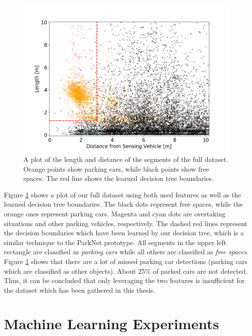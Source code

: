 \begin{figure}
	\centering
	\includegraphics[width=\textwidth]{img/2d_length_distance_scatter_full_dataset_decision_tree_boundaries.png}
	\caption{A plot of the length and distance of the segments of the full dataset. Orange points show parking cars, while black points show free spaces. The red line shows the learned decision tree boundaries.}
	\label{fig:plot_2d_decision_tree}
\end{figure}

Figure \ref{fig:plot_2d_decision_tree} shows a plot of our full dataset using both used features as well as the learned decision tree boundaries. The black dots represent free spaces, while the orange ones represent parking cars. Magenta and cyan dots are overtaking situations and other parking vehicles, respectively. The dashed red lines represent the decision boundaries which have been learned by our decision tree, which is a similar technique to the ParkNet prototype. All segments in the upper left rectangle are classified as \emph{parking cars} while all others are classified as \emph{free spaces}. Figure \ref{fig:plot_2d_decision_tree} shows that there are a lot of missed parking car detections (parking cars which are classified as other objects). About 25\% of parked cars are not detected. Thus, it can be concluded that only leveraging the two features is insufficient for the dataset which has been gathered in this thesis.










\section{Machine Learning Experiments}
\label{sec:machine_learning_experiments}

